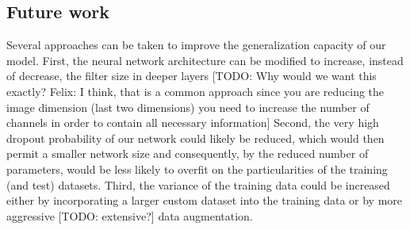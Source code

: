 \documentclass[a4paper]{article}
\begin{document}
\subsection{Future work}
Several approaches can be taken to improve the generalization capacity of our model. First, the neural network architecture can be modified to increase, instead of decrease, the filter size in deeper layers [TODO: Why would we want this exactly? Felix: I think, that is a common approach since you are reducing the image dimension (last two dimensions) you need to increase the number of channels in order to contain all necessary information] Second, the very high dropout probability of our network could likely be reduced, which would then permit a smaller network size and consequently, by the reduced number of parameters, would be less likely to overfit on the particularities of the training (and test) datasets. Third, the variance of the training data could be increased either by incorporating a larger custom dataset into the training data or by more aggressive [TODO: extensive?] data augmentation.


\end{document}
